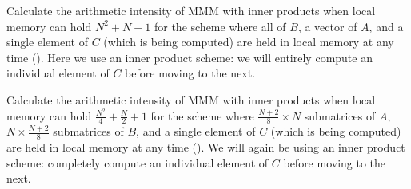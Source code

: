 \documentclass[a4 paper]{article}
\begin{document}
Calculate the arithmetic intensity of MMM with inner products when local memory can hold $N^2 + N + 1$ for the scheme where all of $B$, a vector of $A$, and a single element of $C$ (which is being computed) are held in local memory at any time ().
Here we use an inner product scheme: we will entirely compute an individual element of $C$ before moving to the next.


Calculate the arithmetic intensity of MMM with inner products when local memory can hold $\frac{N^2}{4} + \frac{N}{2} + 1$ for the scheme where $\frac{N+2}{8} \times N$ submatrices of $A$, $N \times \frac{N+2}{8}$ submatrices of $B$, and a single element of $C$ (which is being computed) are held in local memory at any time ().
We will again be using an inner product scheme: completely compute an individual element of $C$ before moving to the next.
\end{document}
